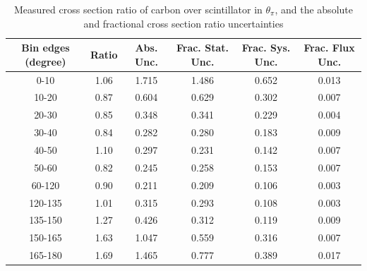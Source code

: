 \documentclass[../main.tex]{subfiles}
\begin{document}
\begin{table}
  \centering
  \renewcommand{\arraystretch}{1.15}
  \caption{Measured cross section ratio of carbon over scintillator in $\theta_{\pi}$, and the absolute and fractional cross section ratio uncertainties}
    \begin{tabular}{c||c|c||c|c|c}
      Bin edges (degree) &  Ratio  &  Abs. Unc.  &  Frac. Stat. Unc.  &  Frac. Sys. Unc.  &  Frac. Flux Unc. \\
      \hline
      \hline
      0-10 & 1.06 & 1.715 & 1.486 & 0.652 & 0.013\\
      10-20 & 0.87 & 0.604 & 0.629 & 0.302 & 0.007\\
      20-30 & 0.85 & 0.348 & 0.341 & 0.229 & 0.004\\
      30-40 & 0.84 & 0.282 & 0.280 & 0.183 & 0.009\\
      40-50 & 1.10 & 0.297 & 0.231 & 0.142 & 0.007\\
      50-60 & 0.82 & 0.245 & 0.258 & 0.153 & 0.007\\
      60-120 & 0.90 & 0.211 & 0.209 & 0.106 & 0.003\\
      120-135 & 1.01 & 0.315 & 0.293 & 0.108 & 0.003\\
      135-150 & 1.27 & 0.426 & 0.312 & 0.119 & 0.009\\
      150-165 & 1.63 & 1.047 & 0.559 & 0.316 & 0.007\\
      165-180 & 1.69 & 1.465 & 0.777 & 0.389 & 0.017
    \end{tabular}
  \label{tbl:rationucleonnuc6pion_thetaa}
\end{table}
\pagebreak
\end{document}
